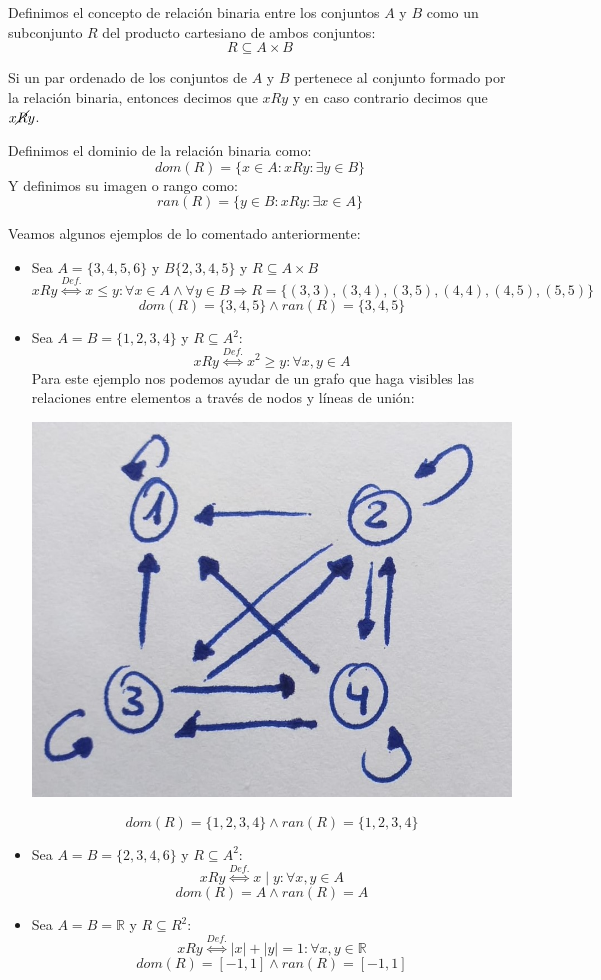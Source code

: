 \documentclass[10pt,a4paper,openright]{book}
\begin{document}
Definimos el concepto de relación binaria entre los conjuntos $A$ y $B$ como un subconjunto $R$ del producto cartesiano de ambos conjuntos: 
$$R\subseteq A\times B$$

Si un par ordenado de los conjuntos de $A$ y $B$ pertenece al conjunto formado por la relación binaria, entonces decimos que $xRy$ y en caso contrario decimos que $x\cancel{R}y$.\par

Definimos el dominio de la relación binaria como:
$$dom(R)=\{x\in A: xRy: \exists y \in B\}$$
Y definimos su imagen o rango como:
$$ran(R)=\{y\in B: xRy: \exists x\in A\}$$\par

Veamos algunos ejemplos de lo comentado anteriormente:
\begin{itemize}
\item Sea $A=\{3,4,5,6\}$ y $B\{2,3,4,5\}$ y $R\subseteq A\times B$
$$xRy\stackrel{Def.}{\Leftrightarrow} x\leq y: \forall x\in A \wedge \forall y\in B\Rightarrow R=\{(3,3), (3,4), (3,5), (4,4), (4,5), (5,5)\}$$
$$dom(R)=\{3,4,5\}\wedge ran (R)=\{3,4,5\}$$

\item Sea $A=B=\{1,2,3,4\}$ y $R\subseteq A^2$:
$$xRy\stackrel{Def.}{\Leftrightarrow}x^2\geq y: \forall x,y\in A$$
Para este ejemplo nos podemos ayudar de un grafo que haga visibles las relaciones entre elementos a través de nodos y líneas de unión:

\begin{center}
\includegraphics[scale=0.15]{ejemplo 2 relaciones}
\end{center}

$$dom (R)=\{1,2,3,4\}\wedge ran (R)=\{1,2,3,4\}$$

\item Sea $A=B=\{2,3,4,6\}$ y $R\subseteq A^2$:
$$xRy\stackrel{Def.}{\Leftrightarrow} x\mid y: \forall x,y\in A$$
$$dom(R)=A\wedge ran (R)=A$$

\item Sea $A=B=\mathbb R$ y $R\subseteq R^2$:
$$xRy\stackrel{Def.}{\Leftrightarrow} |x|+|y|=1: \forall x,y\in \mathbb R$$
$$dom(R)=[-1,1]\wedge ran (R)=[-1,1]$$
\end{itemize}
\end{document}
